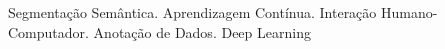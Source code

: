 \documentclass[dissertmst]{ufscar}
\begin{document}
\begin{resumo}{Segmentação Semântica. Aprendizagem Contínua. Interação Humano-Computador. Anotação de Dados. Deep Learning}

\end{resumo}
\end{document}
